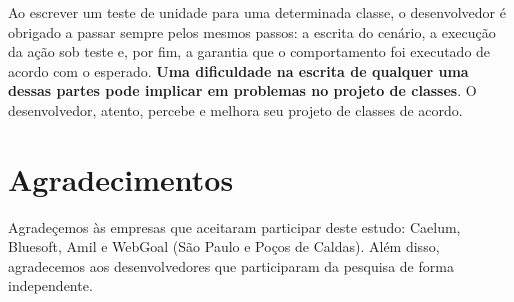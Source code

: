 \documentclass[conference]{IEEEtran}
\begin{document}
Ao escrever um teste de unidade para uma determinada classe, o desenvolvedor
é obrigado a passar sempre pelos mesmos passos: a escrita do cenário, a execução
da ação sob teste e, por fim, a garantia que o comportamento foi executado 
de acordo com o esperado.
\textbf{Uma dificuldade na escrita de qualquer uma dessas partes pode implicar
em problemas no projeto de classes}. O desenvolvedor, atento, percebe e 
melhora seu projeto de classes de acordo.

\section*{Agradecimentos}

Agradeçemos às empresas que aceitaram participar deste estudo: Caelum, Bluesoft,
Amil e WebGoal (São Paulo e Poços de Caldas). Além disso, agradecemos aos
desenvolvedores que participaram da pesquisa de forma independente.


\footnotesize{}

\end{document}

